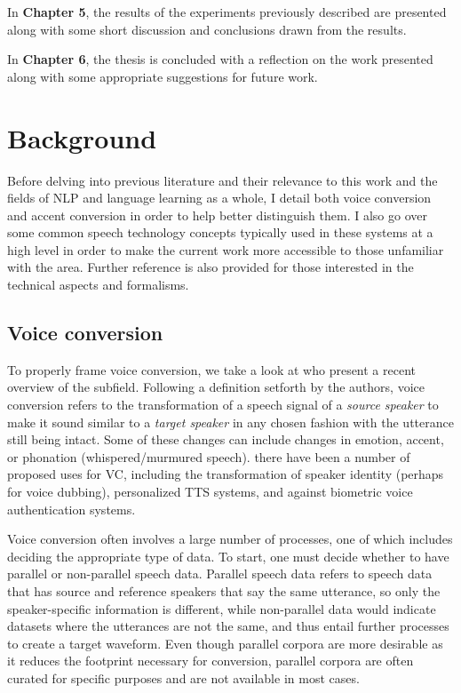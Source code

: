 \documentclass
[
    a4paper,
    twoside,
    12pt
]
{report}
\begin{document}
In \textbf{Chapter 5}, the results of the experiments previously
described are presented along with some short discussion and conclusions
drawn from the results.

In \textbf{Chapter 6}, the thesis is concluded with a reflection on the
work presented along with some appropriate suggestions for future work.
\cleardoublepage

\chapter{Background}

Before delving into previous literature and their relevance to this work
and the fields of NLP and language learning as a whole, I detail both
voice conversion and accent conversion in order to help better
distinguish them. I also go over some common speech technology concepts
typically used in these systems at a high level in order to make the
current work more accessible to those unfamiliar with the area. Further
reference is also provided for those interested in the technical aspects
and formalisms.

\hypertarget{voice-conversion}{%
\section{Voice conversion}\label{voice-conversion}}

To properly frame voice conversion, we take a look at
\textcite{mohammadi2017} who present a recent overview of the subfield.
Following a definition setforth by the authors, voice conversion refers
to the transformation of a speech signal of a \emph{source speaker} to
make it sound similar to a \emph{target speaker} in any chosen fashion
with the utterance still being intact. Some of these changes can include
changes in emotion, accent, or phonation (whispered/murmured speech).
there have been a number of proposed uses for VC, including the
transformation of speaker identity (perhaps for voice dubbing),
personalized TTS systems, and against biometric voice authentication
systems.

Voice conversion often involves a large number of processes, one of
which includes deciding the appropriate type of data. To start, one must
decide whether to have parallel or non-parallel speech data. Parallel
speech data refers to speech data that has source and reference speakers
that say the same utterance, so only the speaker-specific information is
different, while non-parallel data would indicate datasets where the
utterances are not the same, and thus entail further processes to create
a target waveform. Even though parallel corpora are more desirable as it
reduces the footprint necessary for conversion, parallel corpora are
often curated for specific purposes and are not available in most cases.
\end{document}
